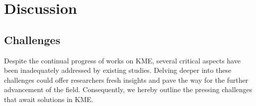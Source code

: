 \documentclass[acmsmall, screen]{acmart}
\begin{document}





\section{Discussion}\label{sec:discuss}







\subsection{Challenges}
Despite the continual progress of works on KME, several critical aspects have been inadequately addressed by existing studies. Delving deeper into these challenges could offer researchers fresh insights and pave the way for the further advancement of the field. Consequently, we hereby outline the pressing challenges that await solutions in KME.


\end{document}
